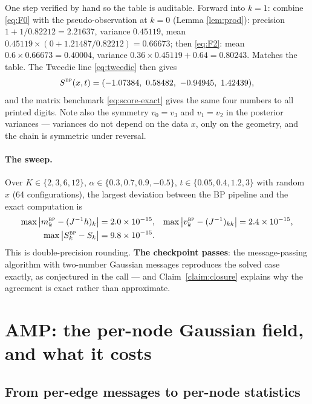 \documentclass[11pt]{article}
\theoremstyle{definition}
\theoremstyle{remark}
\begin{document}
\noindent
One step verified by hand so the table is auditable. Forward into $k=1$:
combine \eqref{eq:F0} with the pseudo-observation at $k=0$ (Lemma
\ref{lem:prod}): precision $1+1/0.82212=2.21637$, variance $0.45119$,
mean $0.45119\times(0+1.21487/0.82212)=0.66673$; then \eqref{eq:F2}:
mean $0.6\times0.66673=0.40004$, variance
$0.36\times0.45119+0.64=0.80243$. Matches the table. The
Tweedie line \eqref{eq:tweedie} then gives
\[
  S^{\textsc{bp}}(x,t)=(-1.07384,\ 0.58482,\ -0.94945,\ 1.42439),
\]
and the matrix benchmark \eqref{eq:score-exact} gives the same four numbers
to all printed digits. Note also the symmetry $v_0=v_3$ and $v_1=v_2$ in
the posterior variances --- variances do not depend on the data $x$, only
on the geometry, and the chain is symmetric under reversal.

\paragraph{The sweep.} Over $K\in\{2,3,6,12\}$,
$\alpha\in\{0.3,0.7,0.9,-0.5\}$, $t\in\{0.05,0.4,1.2,3\}$ with random $x$
(64 configurations), the largest deviation between the BP pipeline and the
exact computation is
\begin{align*}
  \max\big|m^{\textsc{bp}}_k-(J^{-1}h)_k\big|&=2.0\times10^{-15},&
  \max\big|v^{\textsc{bp}}_k-(J^{-1})_{kk}\big|&=2.4\times10^{-15},\\
  \max\big|S^{\textsc{bp}}_k-S_k\big|&=9.8\times10^{-15}.&&
\end{align*}
This is double-precision rounding. \textbf{The checkpoint passes}: the
message-passing algorithm with two-number Gaussian messages reproduces the
solved case exactly, as conjectured in the call --- and
Claim~\ref{claim:closure} explains why the agreement is exact rather than
approximate.

\section{AMP: the per-node Gaussian field, and what it costs}\label{sec:amp}

\subsection{From per-edge messages to per-node statistics}
\end{document}
